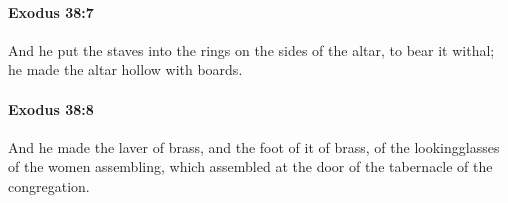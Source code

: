 		\paragraph{Exodus 38:7} %
			\label{EXODUS-38-7}

			And he put the staves into the rings on the sides of the altar, to bear it withal; he made the altar hollow with boards.


		\paragraph{Exodus 38:8} %
			\label{EXODUS-38-8}

			And he made the laver of brass, and the foot of it of brass, of the lookingglasses of the women assembling, which assembled at the door of the tabernacle of the congregation.


